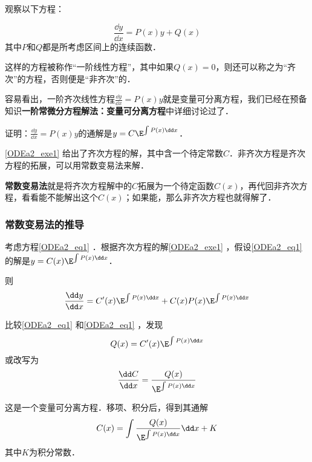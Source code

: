 

观察以下方程：

\begin{equation}\label{ODEa2_eq1}
\frac{\dd y}{\dd x}=P(x)y+Q(x)
\end{equation}
其中$P$和$Q$都是所考虑区间上的连续函数．

这样的方程被称作“一阶线性方程”，其中如果$Q(x)=0$，则还可以称之为“齐次”的方程，否则便是“非齐次”的．

容易看出，一阶齐次线性方程$\frac{\dd y}{\dd x}=P(x)y$就是变量可分离方程，我们已经在预备知识\textbf{一阶常微分方程解法：变量可分离方程}中详细讨论过了．

\begin{exercise}{}\label{ODEa2_exe1}
证明：$\frac{\dd y}{\dd x}=P(x)y$的通解是$y=C\E^{\int P(x)\dd x}$．
\end{exercise}

\autoref{ODEa2_exe1} 给出了齐次方程的解，其中含一个待定常数$C$．非齐次方程是齐次方程的拓展，可以用常数变易法来解．

\textbf{常数变易法}就是将齐次方程解中的$C$拓展为一个待定函数$C(x)$，再代回非齐次方程，看看能不能解出这个$C(x)$；如果能，那么非齐次方程也就得解了．

\subsubsection{常数变易法的推导}
考虑方程\autoref{ODEa2_eq1} ．根据齐次方程的解\autoref{ODEa2_exe1} ，假设\autoref{ODEa2_eq1} 的解是$y=C(x)\E^{\int P(x)\dd x}$．

则
\begin{equation}
\begin{aligned}
\frac{\dd y}{\dd x}=C'(x)\E^{\int P(x)\dd x}+C(x)P(x)\E^{\int P(x)\dd x}
\end{aligned}
\end{equation}

比较\autoref{ODEa2_eq1} 和\autoref{ODEa2_eq1} ，发现
\begin{equation}
Q(x)=C'(x)\E^{\int P(x)\dd x}
\end{equation}
或改写为
\begin{equation}
\frac{\dd C}{\dd x}=\frac{Q(x)}{\E^{\int P(x)\dd x}}
\end{equation}

这是一个变量可分离方程．移项、积分后，得到其通解
\begin{equation}
C(x)=\int\frac{Q(x)}{\E^{\int P(x)\dd x}}\dd x+K
\end{equation}
其中$K$为积分常数．

